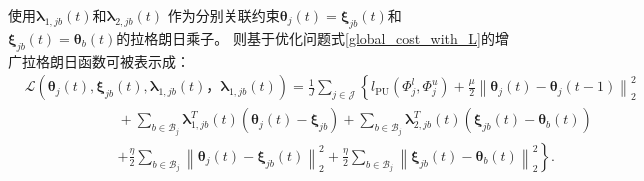使用$\boldsymbol\lambda_{1,jb}\left(t\right)$和$\boldsymbol\lambda_{2,jb}\left(t\right)$
作为分别关联约束${\boldsymbol{\theta}_j}\left(t\right)=\boldsymbol{\xi}_{jb}\left(t\right)$和
$\boldsymbol{\xi}_{jb}\left(t\right)={\boldsymbol{\theta}_b}\left(t\right)$的拉格朗日乘子。
则基于优化问题式\eqref{global_cost_with_L}的增广拉格朗日函数可被表示成：
\begin{equation}
    \label{global_Largrange}
    \begin{split}
        &\mathcal{L}\left({\boldsymbol{\theta}_j}\left(t\right), \boldsymbol{\xi}_{jb}\left(t\right),
        \boldsymbol\lambda_{1,jb}\left(t\right)， \boldsymbol\lambda_{1,jb}\left(t\right)\right)
        = \frac{1}{J}\sum\limits_{j \in \mathcal{J}} \left\{ l_{\mathrm{PU}}\left(\boldsymbol\varPhi_j^l,\boldsymbol\varPhi_j^u\right)
        + \frac{\mu}{2}{\left\| {{\boldsymbol{\theta}_j}\left(t\right)} - {{\boldsymbol{\theta}_j}}\left({t - 1} \right) \right\|_2^2} \right. \\
        &~~~~~~~~~~~~~~~~~~~~~~~~~~~~~~+ \sum\limits_{b\in\mathcal{B}_j}\boldsymbol\lambda_{1,jb}^T\left(t\right){\left({\boldsymbol{\theta}_j}\left(t\right) - \boldsymbol{\xi}_{jb}\right) } 
        + \sum\limits_{b\in\mathcal{B}_j}\boldsymbol\lambda_{2,jb}^T\left(t\right){\left(\boldsymbol{\xi}_{jb}\left(t\right) - \boldsymbol{\theta}_b\left(t\right)\right)} \\
        &~~~~~~~~~~~~~~~~~~~~~~~~~~~~~~\left.+ \frac{\eta}{2}\sum\limits_{b \in \mathcal{B}_j}\left\|{\boldsymbol{\theta}_j\left(t\right)}-\boldsymbol{\xi}_{jb}\left(t\right)\right\|_2^2 
        + \frac{\eta}{2}\sum\limits_{b \in \mathcal{B}_j}\left\|\boldsymbol{\xi}_{jb}\left(t\right) - \boldsymbol{\theta}_b\left(t\right)\right\|_2^2  \right\}.
    \end{split}
\end{equation}

